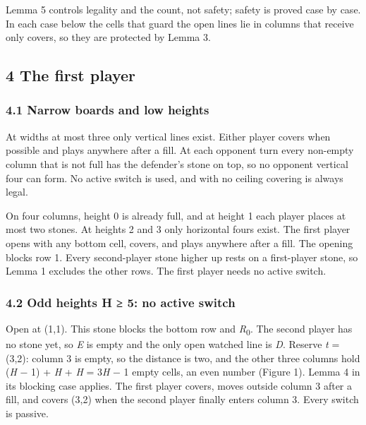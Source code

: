 \documentclass[
  a4paper,
]{article}
\begin{document}
Lemma 5 controls legality and the count, not safety; safety is proved
case by case. In each case below the cells that guard the open lines lie
in columns that receive only covers, so they are protected by Lemma 3.

\subsection{4 The first player}\label{the-first-player}

\subsubsection{4.1 Narrow boards and low
heights}\label{narrow-boards-and-low-heights}

At widths at most three only vertical lines exist. Either player covers
when possible and plays anywhere after a fill. At each opponent turn
every non-empty column that is not full has the defender's stone on top,
so no opponent vertical four can form. No active switch is used, and
with no ceiling covering is always legal.

On four columns, height 0 is already full, and at height 1 each player
places at most two stones. At heights 2 and 3 only horizontal fours
exist. The first player opens with any bottom cell, covers, and plays
anywhere after a fill. The opening blocks row 1. Every second-player
stone higher up rests on a first-player stone, so Lemma 1 excludes the
other rows. The first player needs no active switch.

\subsubsection{4.2 Odd heights H ≥ 5: no active
switch}\label{odd-heights-h-5-no-active-switch}

Open at (1,1). This stone blocks the bottom row and
\emph{R}\textsubscript{0}. The second player has no stone yet, so
\emph{E} is empty and the only open watched line is \emph{D}. Reserve
\emph{t} = (3,2): column 3 is empty, so the distance is two, and the
other three columns hold (\emph{H} − 1) + \emph{H} + \emph{H} =
3\emph{H} − 1 empty cells, an even number (Figure 1). Lemma 4 in its
blocking case applies. The first player covers, moves outside column 3
after a fill, and covers (3,2) when the second player finally enters
column 3. Every switch is passive.
\end{document}
